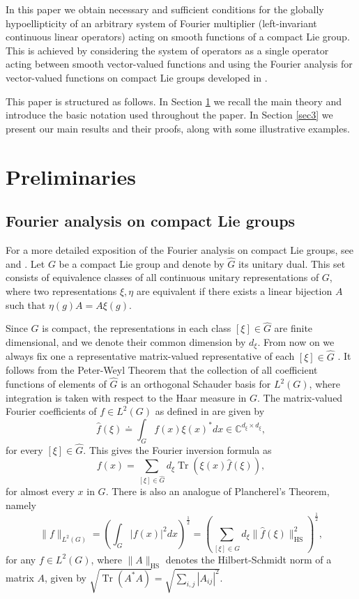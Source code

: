 \documentclass[11pt]{amsart}
\numberwithin{theorem}{section}
\numberwithin{equation}{section}
\theoremstyle{definition}
\numberwithin{example}{section}
\theoremstyle{definition}
\theoremstyle{definition}
\newcommand{\Tr}{\operatorname{Tr}}
\newcommand{\HS}{\operatorname{HS}}
\begin{document}
In this paper we obtain necessary and sufficient conditions for the globally hypoellipticity of an arbitrary system of Fourier multiplier (left-invariant continuous linear operators) acting on smooth functions of a compact Lie group. This is achieved by considering the system of operators as a single operator acting between smooth vector-valued functions and using the Fourier analysis for vector-valued functions on compact Lie groups developed in \cite{HomoVector}.

This paper is structured as follows. In Section \ref{sec2} we recall the main theory and introduce the basic notation used throughout the paper. In Section \ref{sec3} we present our main results and their proofs, along with some illustrative examples.

\section{Preliminaries}\label{sec2}



\subsection{Fourier analysis on compact Lie groups}
For a more detailed exposition of the Fourier analysis on compact Lie groups, see \cite{HomoVector} and \cite{Ruz}. Let $G$ be a compact Lie group and denote by $\widehat{G}$ its unitary dual. This set consists of equivalence classes of all continuous unitary representations of $G$, where two representations $\xi,\eta$ are equivalent if there exists a linear bijection $A$ such that $\eta(g)A=A\xi(g)$. 

Since $G$ is compact, the representations in each class $[\xi]\in\widehat{G}$ are finite dimensional, and we denote their common dimension by $d_\xi$. From now on we always fix one a representative matrix-valued representative of each $[\xi]\in\widehat{G}$ . It follows from the Peter-Weyl Theorem that the collection of all coefficient functions of elements of $\widehat{G}$ is an orthogonal Schauder basis for $L^2(G)$, where integration is taken with respect to the Haar measure in $G$. The matrix-valued Fourier coefficients of $f\in L^2(G)$ as defined in \cite{Ruz} are given by 
\begin{equation*}
    \widehat{f}(\xi)\doteq \int_G f(x)\xi(x)^*dx\in\mathbb{C}^{d_\xi\times d_\xi}, 
\end{equation*}
for every $ [\xi]\in\widehat{G}$.
This gives the Fourier inversion formula as
\begin{equation*}
    f(x)=\sum_{[\xi]\in\widehat{G}} d_\xi\Tr\left(\xi(x)\widehat{f}(\xi)\right),
\end{equation*}
for almost every $x$ in $G$. There is also an analogue of Plancherel's Theorem, namely
\begin{equation*}
    \|f\|_{L^2(G)}=\left(\int_G|f(x)|^2dx\right)^{\frac{1}{2}}=\left(\sum_{[\xi]\in \widehat{G}}d_\xi\|\widehat{f}(\xi)\|_{\HS}^2\right)^{\frac{1}{2}},
\end{equation*}
for any $f\in L^2(G)$, where $\|A\|_{\HS}$ denotes the Hilbert-Schmidt norm of a matrix $A$, given by $\sqrt{\Tr(A^*A)}=\sqrt{\sum_{i,j}|A_{ij}|^2}$.
\end{document}
